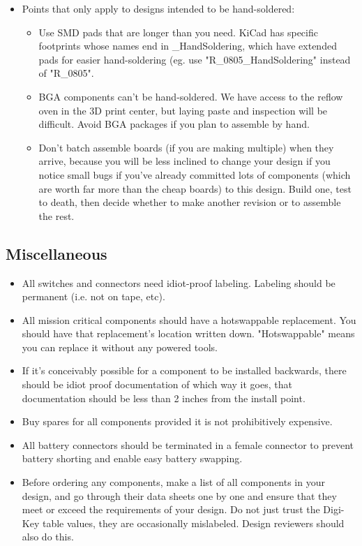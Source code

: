 \documentclass{article}
\begin{document}
\begin{itemize}
\item Points that only apply to designs intended to be hand-soldered:
\begin{itemize}
\item Use SMD pads that are longer than you need. KiCad has specific footprints whose names end in \_HandSoldering, which have extended pads for easier hand-soldering (eg. use "R\_0805\_HandSoldering" instead of "R\_0805".
\item BGA components can't be hand-soldered. We have access to the reflow oven in the 3D print center, but laying paste and inspection will be difficult. Avoid BGA packages if you plan to assemble by hand.
\item Don't batch assemble boards (if you are making multiple) when they arrive, because you will be less inclined to change your design if you notice small bugs if you've already committed lots of components (which are worth far more than the cheap boards) to this design. Build one, test to death, then decide whether to make another revision or to assemble the rest.
\end{itemize}
\end{itemize}

\subsection{Miscellaneous}
\begin{itemize}
\item All switches and connectors need idiot-proof labeling. Labeling should be permanent (i.e. not on tape, etc).
\item All mission critical components should have a hotswappable replacement. You should have that replacement's location written down. "Hotswappable" means you can replace it without any powered tools.
\item If it's conceivably possible for a component to be installed backwards, there should be idiot proof documentation of which way it goes, that documentation should be less than 2 inches from the install point.
\item Buy spares for all components provided it is not prohibitively expensive.
\item All battery connectors should be terminated in a female connector to prevent battery shorting and enable easy battery swapping.
\item Before ordering any components, make a list of all components in your design, and go through their data sheets one by one and ensure that they meet or exceed the requirements of your design. Do not just trust the Digi-Key table values, they are occasionally mislabeled. Design reviewers should also do this.
\end{itemize}
\end{document}
